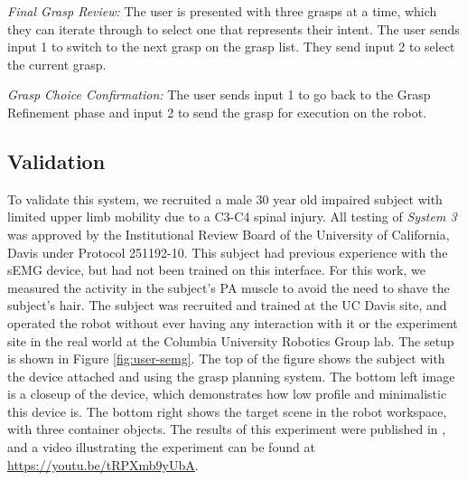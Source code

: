 \emph{Final Grasp Review:} The user is presented with three grasps at a time, which they can iterate through to select one that represents their intent. The user sends input 1 to switch to the next grasp on the grasp list. They send input 2 to select the current grasp. 

\emph{Grasp Choice Confirmation:} The user sends input 1 to go back to the Grasp Refinement phase and input 2 to send the grasp for execution on the robot.


\subsection{Validation}
To validate this system, we recruited a male 30 year old impaired subject with limited upper limb mobility due to a C3-C4 spinal injury. All testing of \emph{System 3} was approved by the Institutional Review Board of the University of California, Davis under Protocol 251192-10. This subject had previous experience with the sEMG device, but had not been trained on this interface. For this work, we measured the activity in the subject's PA muscle to avoid the need to shave the subject's hair. The subject was recruited and trained at the UC Davis site, and operated the robot without ever having any interaction with it or the experiment site in the real world at the Columbia University Robotics Group lab. The setup is shown in Figure \ref{fig:user-semg}. The top of the figure shows the subject with the device attached and using the grasp planning system. The bottom left image is a closeup of the device, which demonstrates how low profile and minimalistic this device is. The bottom right shows the target scene in the robot workspace, with three container objects. The results of this experiment were published in \cite{Weisz2014}, and a video illustrating the experiment can be found at \url{https://youtu.be/tRPXmb9yUbA}.
